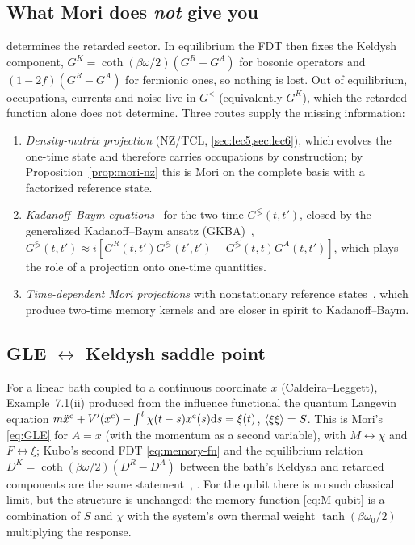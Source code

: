 \subsection{What Mori does \emph{not} give you}

 determines the retarded sector.
In equilibrium the FDT then fixes the Keldysh component, $G^K=\coth(\beta\omega/2)(G^R-G^A)$ for bosonic operators and $(1-2f)(G^R-G^A)$ for fermionic ones, so nothing is lost.
Out of equilibrium, occupations, currents and noise live in $G^<$ (equivalently $G^K$), which the retarded function alone does not determine.
Three routes supply the missing information:
\begin{enumerate}[itemsep=1pt]
\item \emph{Density-matrix projection} (NZ/TCL, \cref{sec:lec5,sec:lec6}), which evolves the one-time state and therefore carries occupations by construction; by Proposition~\ref{prop:mori-nz} this is Mori on the complete basis with a factorized reference state.
\item \emph{Kadanoff--Baym equations}~\cite{KadanoffBaym,StefanucciVanLeeuwen} for the two-time $G^{\lessgtr}(t,t')$, closed by the generalized Kadanoff--Baym ansatz (GKBA)~\cite{Lipavsky1986}, $G^{\lessgtr}(t,t')\approx i[G^R(t,t')G^{\lessgtr}(t',t')-G^{\lessgtr}(t,t)G^A(t,t')]$, which plays the role of a projection onto one-time quantities.
\item \emph{Time-dependent Mori projections} with nonstationary reference states~\cite[Ch.~2]{Grabert1982}, which produce two-time memory kernels and are closer in spirit to Kadanoff--Baym.
\end{enumerate}

\subsection{GLE \texorpdfstring{$\leftrightarrow$}{<->} Keldysh saddle point}

For a linear bath coupled to a continuous coordinate $x$ (Caldeira--Leggett), Example~7.1(ii) produced from the influence functional the quantum Langevin equation $m\ddot x^{\mathrm{c}}+V'(x^{\mathrm{c}})-\int^t\chi(t-s)x^{\mathrm{c}}(s)\mathrm{d} s=\xi(t)$, $\langle\xi\xi\rangle=S$.
This is Mori's \cref{eq:GLE} for $A=x$ (with the momentum as a second variable), with $M\leftrightarrow\chi$ and $F\leftrightarrow\xi$; Kubo's second FDT \eqref{eq:memory-fn} and the equilibrium relation $D^K=\coth(\beta\omega/2)(D^R-D^A)$ between the bath's Keldysh and retarded components are the same statement~\cite[Sec.~3.2]{Kamenev2011}, \cite[Ch.~3]{Gardiner2004}.
For the qubit there is no such classical limit, but the structure is unchanged: the memory function \eqref{eq:M-qubit} is a combination of $S$ and $\chi$ with the system's own thermal weight $\tanh(\beta\omega_0/2)$ multiplying the response.

